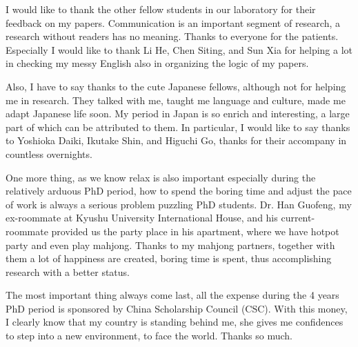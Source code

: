 \documentclass[12pt, twoside, a4paper]{book} %
\begin{document}
I would like to thank the other fellow students in our laboratory for their feedback on my papers. Communication is an important segment of research, a research without readers has no meaning. Thanks to everyone for the patients. Especially I would like to thank Li He, Chen Siting, and Sun Xia for helping a lot in checking my messy English also in organizing the logic of my papers. 

Also, I have to say thanks to the cute Japanese fellows, although not for helping me in research. They talked with me, taught me language and culture, made me adapt Japanese life soon. My period in Japan is so enrich and interesting, a large part of which can be attributed to them. In particular, I would like to say thanks to Yoshioka Daiki, Ikutake Shin, and Higuchi Go, thanks for their accompany in countless overnights.

One more thing, as we know relax is also important especially during the relatively arduous PhD period, how to spend the boring time and adjust the pace of work is always a serious problem puzzling PhD students. Dr. Han Guofeng, my ex-roommate at Kyushu University International House, and his current-roommate provided us the party place in his apartment, where we have hotpot party and even play mahjong. Thanks to my mahjong partners, together with them a lot of happiness are created, boring time is spent, thus accomplishing research with a better status.

The most important thing always come last, all the expense during the 4 years PhD period is sponsored by China Scholarship Council (CSC). With this money, I clearly know that my country is standing behind me, she gives me confidences to step into a new environment, to face the world. Thanks so much.

\end{document}
